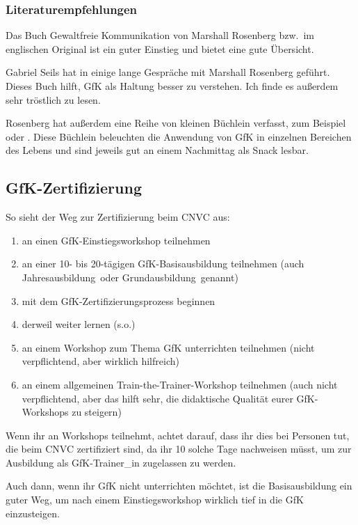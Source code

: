 \subsubsection{Literaturempfehlungen}

Das Buch \glqq Gewaltfreie Kommunikation\grqq{} von Marshall Rosenberg \cite{gfk-rosenberg} bzw.\ im englischen Original \cite{nvc-rosenberg} ist ein guter Einstieg und bietet eine gute Übersicht.

Gabriel Seils hat in \cite{gfk-gespraech} einige lange Gespräche mit Marshall Rosenberg geführt. Dieses Buch hilft, GfK als Haltung besser zu verstehen. Ich finde es außerdem sehr tröstlich zu lesen.

Rosenberg hat außerdem eine Reihe von kleinen Büchlein verfasst, zum Beispiel \cite{we-can-work-it-out} oder \cite{being-me-loving-you}. Diese Büchlein beleuchten die Anwendung von GfK in einzelnen Bereichen des Lebens und sind jeweils gut an einem Nachmittag als Snack lesbar.

\subsection{GfK-Zertifizierung}

So sieht der Weg zur Zertifizierung beim CNVC aus:

\begin{enumerate}
  \item an einen GfK-Einstiegsworkshop teilnehmen
  \item an einer 10- bis 20-tägigen GfK-Basisausbildung teilnehmen (auch \glqq Jahresausbildung\grqq\ oder \glqq Grundausbildung\grqq\ genannt)
  \item mit dem GfK-Zertifizierungsprozess\cite{gfk-trainer-werden} beginnen
  \item derweil weiter lernen (s.o.)
  \item an einem Workshop zum Thema \glqq GfK unterrichten\grqq{} teilnehmen (nicht verpflichtend, aber wirklich hilfreich)
  \item an einem allgemeinen Train-the-Trainer-Workshop teilnehmen (auch nicht verpflichtend, aber das hilft sehr, die didaktische Qualität eurer GfK-Workshops zu steigern)
\end{enumerate}

Wenn ihr an Workshops teilnehmt, achtet darauf, dass ihr dies bei Personen tut, die beim CNVC zertifiziert sind, da ihr 10 solche Tage nachweisen müsst, um zur Ausbildung als GfK-Trainer\_in zugelassen zu werden.

Auch dann, wenn ihr GfK nicht unterrichten möchtet, ist die Basisausbildung ein guter Weg, um nach einem Einstiegsworkshop wirklich tief in die GfK einzusteigen.

